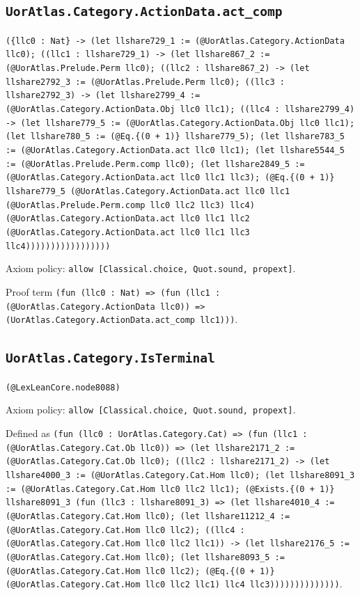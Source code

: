 \documentclass[11pt]{article}
\begin{document}
\subsection*{\texttt{UorAtlas.Category.ActionData.act\_comp}}
\noindent\texttt{(\{llc0 : Nat\} -> (let llshare729\_1 := (@UorAtlas.Category.ActionData llc0); ((llc1 : llshare729\_1) -> (let llshare867\_2 := (@UorAtlas.Prelude.Perm llc0); ((llc2 : llshare867\_2) -> (let llshare2792\_3 := (@UorAtlas.Prelude.Perm llc0); ((llc3 : llshare2792\_3) -> (let llshare2799\_4 := (@UorAtlas.Category.ActionData.Obj llc0 llc1); ((llc4 : llshare2799\_4) -> (let llshare779\_5 := (@UorAtlas.Category.ActionData.Obj llc0 llc1); (let llshare780\_5 := (@Eq.\{(0 + 1)\} llshare779\_5); (let llshare783\_5 := (@UorAtlas.Category.ActionData.act llc0 llc1); (let llshare5544\_5 := (@UorAtlas.Prelude.Perm.comp llc0); (let llshare2849\_5 := (@UorAtlas.Category.ActionData.act llc0 llc1 llc3); (@Eq.\{(0 + 1)\} llshare779\_5 (@UorAtlas.Category.ActionData.act llc0 llc1 (@UorAtlas.Prelude.Perm.comp llc0 llc2 llc3) llc4) (@UorAtlas.Category.ActionData.act llc0 llc1 llc2 (@UorAtlas.Category.ActionData.act llc0 llc1 llc3 llc4)))))))))))))))))}\par
\noindent Axiom policy: \texttt{allow [Classical.choice, Quot.sound, propext]}.\par
\noindent Proof term \texttt{(fun (llc0 : Nat) => (fun (llc1 : (@UorAtlas.Category.ActionData llc0)) => (UorAtlas.Category.ActionData.act\_comp llc1)))}.\par
\subsection*{\texttt{UorAtlas.Category.IsTerminal}}
\noindent\texttt{(@LexLeanCore.node8088)}\par
\noindent Axiom policy: \texttt{allow [Classical.choice, Quot.sound, propext]}.\par
\noindent Defined as \texttt{(fun (llc0 : UorAtlas.Category.Cat) => (fun (llc1 : (@UorAtlas.Category.Cat.Ob llc0)) => (let llshare2171\_2 := (@UorAtlas.Category.Cat.Ob llc0); ((llc2 : llshare2171\_2) -> (let llshare4000\_3 := (@UorAtlas.Category.Cat.Hom llc0); (let llshare8091\_3 := (@UorAtlas.Category.Cat.Hom llc0 llc2 llc1); (@Exists.\{(0 + 1)\} llshare8091\_3 (fun (llc3 : llshare8091\_3) => (let llshare4010\_4 := (@UorAtlas.Category.Cat.Hom llc0); (let llshare11212\_4 := (@UorAtlas.Category.Cat.Hom llc0 llc2); ((llc4 : (@UorAtlas.Category.Cat.Hom llc0 llc2 llc1)) -> (let llshare2176\_5 := (@UorAtlas.Category.Cat.Hom llc0); (let llshare8093\_5 := (@UorAtlas.Category.Cat.Hom llc0 llc2); (@Eq.\{(0 + 1)\} (@UorAtlas.Category.Cat.Hom llc0 llc2 llc1) llc4 llc3))))))))))))))}.\par
\end{document}
